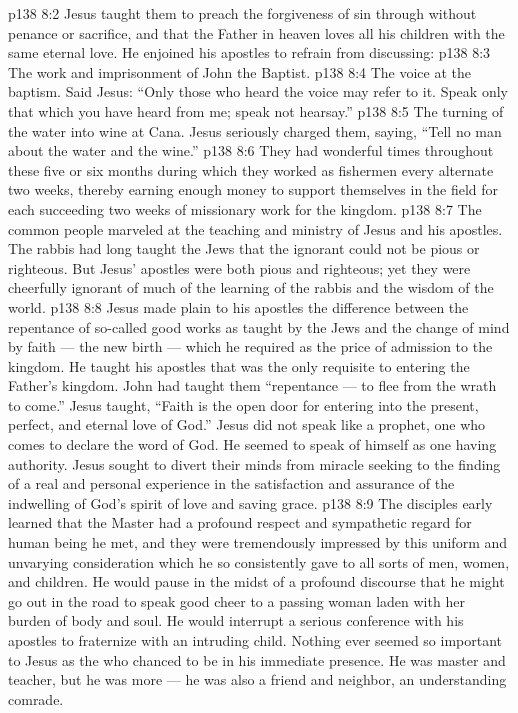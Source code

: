 \vs p138 8:2 Jesus taught them to preach the forgiveness of sin through  without penance or sacrifice, and that the Father in heaven loves all his children with the same eternal love. He enjoined his apostles to refrain from discussing:
\vs p138 8:3 \bibnobreakspace The work and imprisonment of John the Baptist.
\vs p138 8:4 \pc {}\bibnobreakspace The voice at the baptism. Said Jesus: \textcolor{ubdarkred}{“Only those who heard the voice may refer to it. Speak only that which you have heard from me; speak not hearsay.”}
\vs p138 8:5 \pc {}\bibnobreakspace The turning of the water into wine at Cana. Jesus seriously charged them, saying, \textcolor{ubdarkred}{“Tell no man about the water and the wine.”}
\vs p138 8:6 \pc They had wonderful times throughout these five or six months during which they worked as fishermen every alternate two weeks, thereby earning enough money to support themselves in the field for each succeeding two weeks of missionary work for the kingdom.
\vs p138 8:7 The common people marveled at the teaching and ministry of Jesus and his apostles. The rabbis had long taught the Jews that the ignorant could not be pious or righteous. But Jesus’ apostles were both pious and righteous; yet they were cheerfully ignorant of much of the learning of the rabbis and the wisdom of the world.
\vs p138 8:8 \pc Jesus made plain to his apostles the difference between the repentance of so\hyp{}called good works as taught by the Jews and the change of mind by faith --- the new birth --- which he required as the price of admission to the kingdom. He taught his apostles that  was the only requisite to entering the Father’s kingdom. John had taught them “repentance --- to flee from the wrath to come.” Jesus taught, \textcolor{ubdarkred}{“Faith is the open door for entering into the present, perfect, and eternal love of God.”} Jesus did not speak like a prophet, one who comes to declare the word of God. He seemed to speak of himself as one having authority. Jesus sought to divert their minds from miracle seeking to the finding of a real and personal experience in the satisfaction and assurance of the indwelling of God’s spirit of love and saving grace.
\vs p138 8:9 The disciples early learned that the Master had a profound respect and sympathetic regard for  human being he met, and they were tremendously impressed by this uniform and unvarying consideration which he so consistently gave to all sorts of men, women, and children. He would pause in the midst of a profound discourse that he might go out in the road to speak good cheer to a passing woman laden with her burden of body and soul. He would interrupt a serious conference with his apostles to fraternize with an intruding child. Nothing ever seemed so important to Jesus as the  who chanced to be in his immediate presence. He was master and teacher, but he was more --- he was also a friend and neighbor, an understanding comrade.
